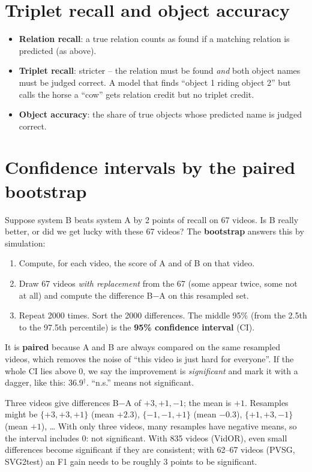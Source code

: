 \documentclass[11pt,openany]{book}
\newcommand{\sig}{\ensuremath{^\dagger}}
\begin{document}
\section{Triplet recall and object accuracy}
\begin{itemize}
  \item \textbf{Relation recall}: a true relation counts as found if a matching relation is predicted (as above).
  \item \textbf{Triplet recall}: stricter -- the relation must be found \emph{and} both object names must be judged correct.
  A model that finds ``object 1 riding object 2'' but calls the horse a ``cow'' gets relation credit but no triplet credit.
  \item \textbf{Object accuracy}: the share of true objects whose predicted name is judged correct.
\end{itemize}

\section{Confidence intervals by the paired bootstrap}
Suppose system B beats system A by 2 points of recall on 67 videos. Is B really better, or did we get lucky with these 67 videos?
The \textbf{bootstrap} answers this by simulation:
\begin{enumerate}
  \item Compute, for each video, the score of A and of B on that video.
  \item Draw 67 videos \emph{with replacement} from the 67 (some appear twice, some not at all) and compute the difference
  B$-$A on this resampled set.
  \item Repeat 2000 times. Sort the 2000 differences. The middle 95\% (from the 2.5th to the 97.5th percentile) is the
  \textbf{95\% confidence interval} (CI).
\end{enumerate}
It is \textbf{paired} because A and B are always compared on the same resampled videos, which removes the noise of ``this video
is just hard for everyone''. If the whole CI lies above 0, we say the improvement is \emph{significant} and mark it with a dagger,
like this: 36.9\sig. ``n.s.'' means not significant.

\begin{keyidea}
Three videos give differences B$-$A of $+3, +1, -1$; the mean is $+1$. Resamples might be $\{+3,+3,+1\}$ (mean $+2.3$),
$\{-1,-1,+1\}$ (mean $-0.3$), $\{+1,+3,-1\}$ (mean $+1$), \dots{} With only three videos, many resamples have negative means, so the
interval includes 0: not significant. With 835 videos (VidOR), even small differences become significant if they are
consistent; with 62--67 videos (PVSG, SVG2test) an F1 gain needs to be roughly 3 points to be significant.
\end{keyidea}
\end{document}
